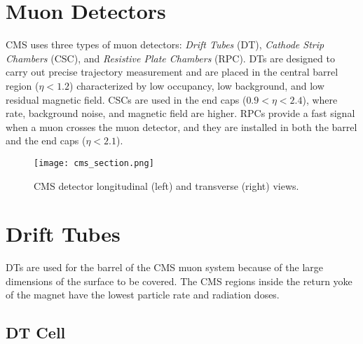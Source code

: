 \documentclass[12pt,twoside,a4paper]{report}
\numberwithin{equation}{section}
\begin{document}
\section{Muon Detectors}
CMS uses three types of muon detectors: \textit{Drift Tubes} (DT), \textit{Cathode Strip Chambers} (CSC), and \textit{Resistive Plate Chambers} (RPC). DTs are designed to carry out precise trajectory measurement and are placed in the central barrel region ($\eta < 1.2$) characterized by low occupancy, low background, and low residual magnetic field. CSCs are used in the end caps ($0.9 < \eta < 2.4$), where rate, background noise, and magnetic field are higher. RPCs provide a fast signal when a muon crosses the muon detector, and they are installed in both the barrel and the end caps ($\eta < 2.1$).

\begin{figure}[!htb]
\texttt{[image: cms\_section.png]}
\caption{\label{fig:cms_section} CMS detector longitudinal (left) and transverse (right) views.}
\end{figure}

\section{Drift Tubes}
DTs are used for the barrel of the CMS muon system because of the large dimensions of the surface to be covered. The CMS regions inside the return yoke of the magnet have the lowest particle rate and radiation doses.

\subsection{DT Cell}
\end{document}
